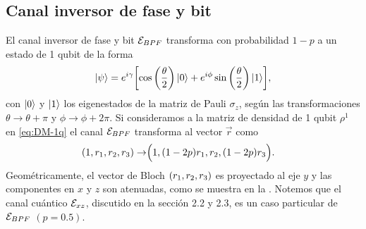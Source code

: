 \subsection{Canal inversor de fase y bit}
El canal inversor de fase y bit $\mathcal{E}_{BPF}$ transforma 
con probabilidad $1-p$ a un estado de 1 qubit de la forma  
\begin{align}
   \ket{\psi}=e^{i\gamma}\qty[\cos\qty(\frac{\theta}{2})\ket{0}
  +e^{i\phi}\sin \qty(\frac{\theta}{2})\ket{1}],
   \label{eq:psi-1qubit}
 \end{align} 
con $\ket{0}$ y $\ket{1}$ los eigenestados de 
la matriz de Pauli $\sigma_z$, según las transformaciones 
$\theta\to\theta+\pi$ y $\phi\to\phi+2\pi$. 
Si consideramos a la matriz de densidad de 1 qubit
$\rho^1$ en \eqref{eq:DM-1q} el canal $\mathcal{E}_{BPF}$ 
transforma  al vector $\vec{r}$ como
\begin{align}
\qty(1,r_1,r_2,r_3)\rightarrow&\Big(1,\qty(1-2p)r_1,r_2,\qty(1-2p)r_3\Big).
\label{eq:bit-phase-flip-Bloch-trans}
\end{align}
Geométricamente, el vector de Bloch $\qty(r_1,r_2,r_3)$ es 
proyectado al eje $y$ y las componentes 
en $x$ y $z$ son atenuadas, como se muestra en la 
.
Notemos que el canal cuántico $\mathcal{E}_{xz}$, discutido 
en la sección 2.2 y 2.3, es un caso particular de $\mathcal{E}_{BPF}$ $(p=0.5)$.

